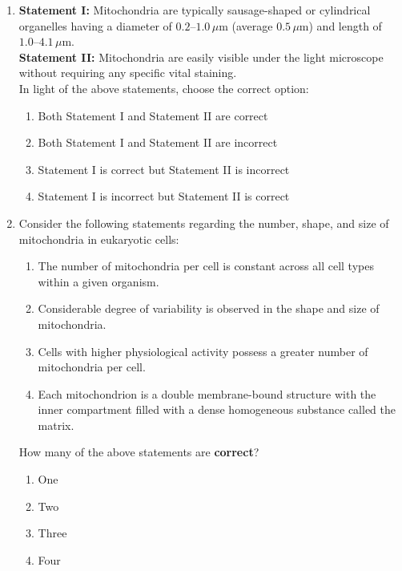 \documentclass[11pt, a4paper]{article}
\begin{document}
\begin{enumerate}[label=\textbf{\arabic*.}, leftmargin=*, itemsep=8pt]

    \item \textbf{Statement I:} Mitochondria are typically sausage-shaped or cylindrical organelles having a diameter of $0.2\text{--}1.0\,\mu\text{m}$ (average $0.5\,\mu\text{m}$) and length of $1.0\text{--}4.1\,\mu\text{m}$.\\
    \textbf{Statement II:} Mitochondria are easily visible under the light microscope without requiring any specific vital staining.\\
    In light of the above statements, choose the correct option:
    \begin{enumerate}[label=(\alph*)]
        \item Both Statement I and Statement II are correct
        \item Both Statement I and Statement II are incorrect
        \item Statement I is correct but Statement II is incorrect
        \item Statement I is incorrect but Statement II is correct
    \end{enumerate}

    \item Consider the following statements regarding the number, shape, and size of mitochondria in eukaryotic cells:
    \begin{enumerate}[label=(\roman*)]
        \item The number of mitochondria per cell is constant across all cell types within a given organism.
        \item Considerable degree of variability is observed in the shape and size of mitochondria.
        \item Cells with higher physiological activity possess a greater number of mitochondria per cell.
        \item Each mitochondrion is a double membrane-bound structure with the inner compartment filled with a dense homogeneous substance called the matrix.
    \end{enumerate}
    How many of the above statements are \textbf{correct}?
    \begin{enumerate}[label=(\alph*)]
        \item One
        \item Two
        \item Three
        \item Four
    \end{enumerate}


\end{enumerate}
\end{document}
